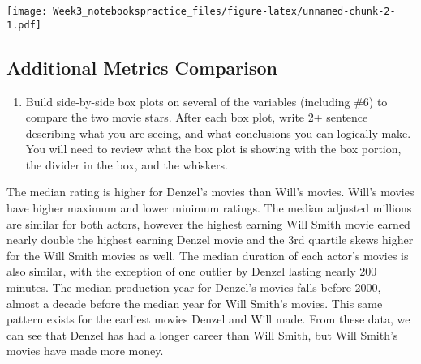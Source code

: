 \documentclass{article}
\providecommand{\tightlist}{%
  \setlength{\itemsep}{0pt}\setlength{\parskip}{0pt}}
\begin{document}
\texttt{[image: Week3\_notebookspractice\_files/figure-latex/unnamed-chunk-2-1.pdf]}

\hypertarget{additional-metrics-comparison}{%
\subsection{Additional Metrics
Comparison}\label{additional-metrics-comparison}}

\begin{enumerate}
\def\labelenumi{\arabic{enumi}.}
\setcounter{enumi}{6}
\tightlist
\item
  Build side-by-side box plots on several of the variables (including
  \#6) to compare the two movie stars. After each box plot, write 2+
  sentence describing what you are seeing, and what conclusions you can
  logically make. You will need to review what the box plot is showing
  with the box portion, the divider in the box, and the whiskers.
\end{enumerate}

The median rating is higher for Denzel's movies than Will's movies.
Will's movies have higher maximum and lower minimum ratings. The median
adjusted millions are similar for both actors, however the highest
earning Will Smith movie earned nearly double the highest earning Denzel
movie and the 3rd quartile skews higher for the Will Smith movies as
well. The median duration of each actor's movies is also similar, with
the exception of one outlier by Denzel lasting nearly 200 minutes. The
median production year for Denzel's movies falls before 2000, almost a
decade before the median year for Will Smith's movies. This same pattern
exists for the earliest movies Denzel and Will made. From these data, we
can see that Denzel has had a longer career than Will Smith, but Will
Smith's movies have made more money.
\end{document}

